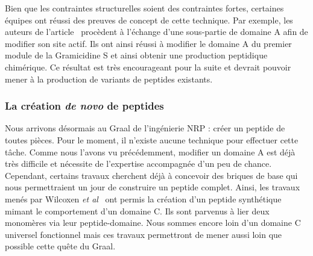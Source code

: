 Bien que les contraintes structurelles soient des contraintes fortes, certaines équipes ont réussi des preuves de concept de cette technique.
Par exemple, les auteurs de l'article~\cite{kries_subdomain_2015} procèdent à l'échange d'une sous-partie de domaine A afin de modifier son site actif.
Ils ont ainsi réussi à modifier le domaine A du premier module de la Gramicidine S et ainsi obtenir une production peptidique chimérique.
Ce résultat est très encourageant pour la suite et devrait pouvoir mener à la production de variants de peptides existants.


\subsubsection{La création \textit{de novo} de peptides}

Nous arrivons désormais au Graal de l’ingénierie NRP : créer un peptide de toutes pièces.
Pour le moment, il n'existe aucune technique pour effectuer cette tâche.
Comme nous l'avons vu précédemment, modifier un domaine A est déjà très difficile et nécessite de l'expertise accompagnée d'un peu de chance.
Cependant, certains travaux cherchent déjà à concevoir des briques de base qui nous permettraient un jour de construire un peptide complet.
Ainsi, les travaux menés par Wilcoxen \textit{et al}~\cite{wilcoxen_biomimetic_2007} ont permis la création d'un peptide synthétique mimant le comportement d'un domaine C.
Ils sont parvenus à lier deux monomères via leur peptide-domaine.
Nous sommes encore loin d'un domaine C universel fonctionnel mais ces travaux permettront de mener aussi loin que possible cette quête du Graal.


